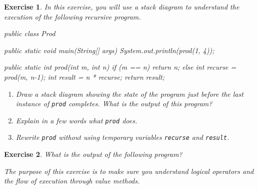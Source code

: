 \documentclass[12pt]{book}
\theoremstyle{exercise}
\newtheorem{exercise}{Exercise}[chapter]
\newcommand{\java}[1]{\verb"#1"}
\newcommand{\java}[1]{\lstinline{#1}} %
\begin{document}
\begin{exercise}

In this exercise, you will use a stack diagram to understand the execution of the following recursive program.

\begin{code}
public class Prod {

    public static void main(String[] args) {
        System.out.println(prod(1, 4));
    }

    public static int prod(int m, int n) {
        if (m == n) {
            return n;
        } else {
            int recurse = prod(m, n-1);
            int result = n * recurse;
            return result;
        }
    }
}
\end{code}

\begin{enumerate}

\item Draw a stack diagram showing the state of the program just before the last instance of \java{prod} completes.
What is the output of this program?

\item Explain in a few words what \java{prod} does.

\item Rewrite \java{prod} without using temporary variables \java{recurse} and \java{result}.

\end{enumerate}

\end{exercise}


\begin{exercise}

What is the output of the following program?


The purpose of this exercise is to make sure you understand logical operators and the flow of execution through value methods.

\end{exercise}
\end{document}
